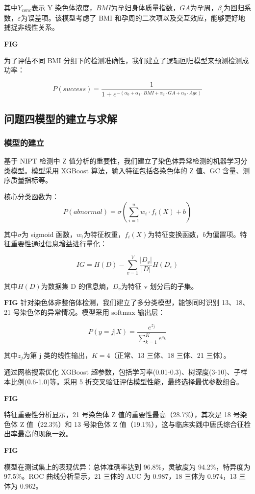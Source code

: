 \documentclass[withoutpreface,bwprint]{cumcmthesis} %
\begin{document}
其中$Y_{conc}$表示 Y 染色体浓度，$BMI$为孕妇身体质量指数，$GA$为孕周，$\beta_i$为回归系数，$\varepsilon$为误差项。该模型考虑了 BMI 和孕周的二次项以及交互效应，能够更好地捕捉非线性关系。

\textbf{FIG}

为了评估不同 BMI 分组下的检测准确性，我们建立了逻辑回归模型来预测检测成功率：

$$P(success) = \frac{1}{1 + e^{-(\alpha_0 + \alpha_1 \cdot BMI + \alpha_2 \cdot GA + \alpha_3 \cdot Age)}}$$

\subsection{问题四模型的建立与求解}
\subsubsection{模型的建立}

基于 NIPT 检测中 Z 值分析的重要性，我们建立了染色体异常检测的机器学习分类模型。模型采用 XGBoost 算法，输入特征包括各染色体的 Z 值、GC 含量、测序质量指标等。

核心分类函数为：
$$P(abnormal) = \sigma(\sum_{i=1}^{n} w_i \cdot f_i(X) + b)$$

其中$\sigma$为 sigmoid 函数，$w_i$为特征权重，$f_i(X)$为特征变换函数，$b$为偏置项。特征重要性通过信息增益进行量化：

$$IG = H(D) - \sum_{v=1}^{V} \frac{|D_v|}{|D|} H(D_v)$$

其中$H(D)$为数据集 D 的信息熵，$D_v$为特征 v 划分后的子集。

\textbf{FIG}
针对染色体非整倍体检测，我们建立了多分类模型，能够同时识别 13、18、21 号染色体的异常情况。模型采用 softmax 输出层：

$$P(y=j|X) = \frac{e^{z_j}}{\sum_{k=1}^{K} e^{z_k}}$$

其中$z_j$为第 j 类的线性输出，$K=4$（正常、13 三体、18 三体、21 三体）。

通过网格搜索优化 XGBoost 超参数，包括学习率(0.01-0.3)、树深度(3-10)、子样本比例(0.6-1.0)等。采用 5 折交叉验证评估模型性能，最终选择最优参数组合。

\textbf{FIG}

特征重要性分析显示，21 号染色体 Z 值的重要性最高（28.7\%），其次是 18 号染色体 Z 值（22.3\%）和 13 号染色体 Z 值（19.1\%），这与临床实践中唐氏综合征检出率最高的现象一致。

\textbf{FIG}

模型在测试集上的表现优异：总体准确率达到 96.8\%，灵敏度为 94.2\%，特异度为 97.5\%。ROC 曲线分析显示，21 三体的 AUC 为 0.987，18 三体为 0.974，13 三体为 0.962。
\end{document}

